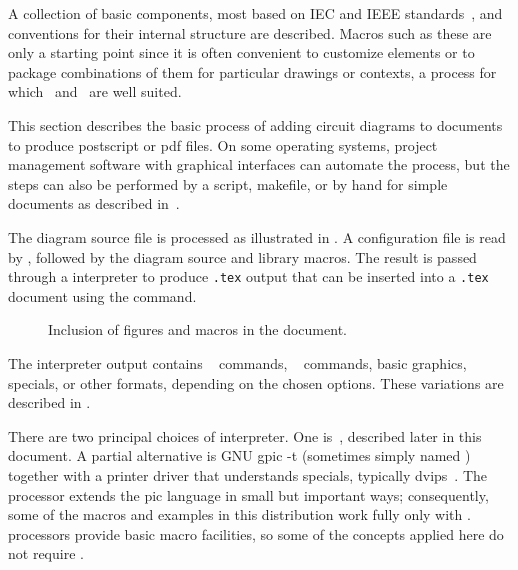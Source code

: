A collection of basic components, most based on IEC and IEEE
standards~\cite{IECstd,IEEEstd},
and conventions for their internal
structure are described.  Macros such as these are only a starting
point since it is often convenient to customize elements or to package
combinations of them for particular drawings or contexts,
a process for which \Mfour\ and \pic\ are well suited.

This section describes the basic process of adding circuit diagrams to
\latex documents to produce postscript or pdf files.  On some operating
systems, project management software with graphical interfaces can
automate the process, but the steps can also be performed by a script,
makefile, or by hand for simple documents as described in~.

The diagram source file is processed as illustrated in
.  A configuration file is read by \Mfour,
followed by the diagram source and library macros.
The result is passed through a
\pic interpreter to produce {\tt .tex} output that can be inserted
into a {\tt .tex} document using the \verb|| command.

\begin{figure}[ht]
 \caption{Inclusion of figures and macros in the \latex document.
 \label{Flowdiag}}
 \end{figure}

\noindent
The interpreter output contains
\TPGF~\cite{tikz} commands,
\PSTricks~\cite{pstricks} commands,
basic \latex graphics, 
\tpic specials, or other formats,
depending on the chosen options.
These variations are described in .

There are two principal choices of \pic interpreter.  One is~\dpic,
described later in this document.  A partial alternative is
GNU {\bq gpic -t} (sometimes simply named \pic)~\cite{gpic}
together with a printer driver
that understands \tpic specials, typically {\bq dvips}~\cite{dvips}.
The \dpic processor extends the pic language in small but important ways;
consequently, some of the macros and examples in this distribution work fully
only with \dpic.
\Pic processors provide basic macro facilities, so some of the
concepts applied here do not require \Mfour.

